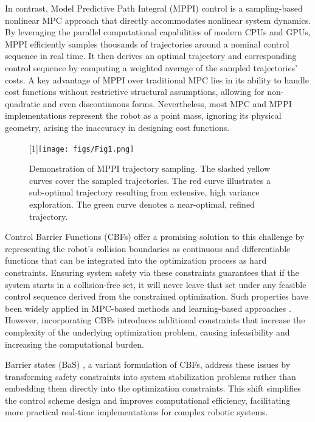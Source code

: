 \documentclass[english]{cccconf}
\begin{document}
In contrast, Model Predictive Path Integral (MPPI) control is a sampling-based nonlinear MPC approach that directly accommodates nonlinear system dynamics. By leveraging the parallel computational capabilities of modern CPUs and GPUs, MPPI efficiently samples thousands of trajectories around a nominal control sequence in real time. It then derives an optimal trajectory and corresponding control sequence by computing a weighted average of the sampled trajectories’ costs. A key advantage of MPPI over traditional MPC lies in its ability to handle cost functions without restrictive structural assumptions, allowing for non-quadratic and even discontinuous forms. Nevertheless, most MPC and MPPI implementations represent the robot as a point mass, ignoring its physical geometry, arising the inaccuracy in designing cost functions.
\begin{figure}
  \vspace{4mm}
  \centering
  \scalebox{-1}[1]{\texttt{[image: figs/Fig1.png]}}
  \caption{Demonstration of MPPI trajectory sampling. The slashed yellow curves cover the sampled trajectories. The red curve illustrates a sub-optimal trajectory resulting from extensive, high variance exploration. The green curve denotes a near-optimal, refined trajectory.}
  \label{fig1}
  
  \vspace{-12mm}
\end{figure}

Control Barrier Functions (CBFs) \cite{ames2019control} offer a promising solution to this challenge by representing the robot’s collision boundaries as continuous and differentiable functions that can be integrated into the optimization process as hard constraints. Ensuring system safety via these constraints guarantees that if the system starts in a collision-free set, it will never leave that set under any feasible control sequence derived from the constrained optimization. Such properties have been widely applied in MPC-based methods \cite{zeng2021safety} and learning-based approaches \cite{cheng2023safe}. However, incorporating CBFs introduces additional constraints that increase the complexity of the underlying optimization problem, causing infeasibility and increasing the computational burden.

Barrier states (BaS) \cite{almubarak2023barrier}, a variant formulation of CBFs, address these issues by transforming safety constraints into system stabilization problems rather than embedding them directly into the optimization constraints. This shift simplifies the control scheme design and improves computational efficiency, facilitating more practical real-time implementations for complex robotic systems.
\end{document}
